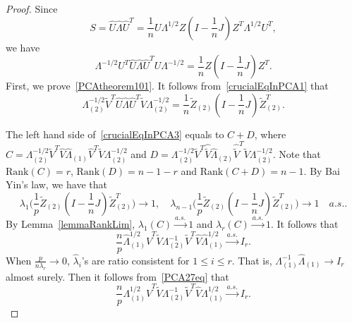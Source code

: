 \begin{proof}

    Since
    \begin{equation*}
        S=\hat{U}\hat{\Lambda}\hat{U}^T=
        \frac{1}{n}U\Lambda^{1/2}Z(I-\frac{1}{n}J)Z^T \Lambda^{1/2} U^T,
    \end{equation*}
    we have
    \begin{equation}\label{crucialEqInPCA1}
        \Lambda^{-1/2}U^T \hat{U}\hat{\Lambda}\hat{U}^T U\Lambda^{-1/2}=
        \frac{1}{n}Z(I-\frac{1}{n}J)Z^T. 
    \end{equation}
    First, we prove~\eqref{PCAtheorem101}.
    It follows from~\eqref{crucialEqInPCA1} that
    \begin{equation}\label{crucialEqInPCA3}
        \Lambda^{-1/2}_{(2)}\tilde{V}^T \hat{U}\hat{\Lambda}\hat{U}^T \tilde{V}\Lambda^{-1/2}_{(2)}=
        \frac{1}{n}\tilde{Z}_{(2)}(I-\frac{1}{n}J)\tilde{Z}_{(2)}^T.
    \end{equation}

    The left hand side of~\eqref{crucialEqInPCA3} equals to $C+D$, where 
    $C= \Lambda^{-1/2}_{(2)}\tilde{V}^T \hat{V}\hat{\Lambda}_{(1)}\hat{V}^T \tilde{V}\Lambda^{-1/2}_{(2)}$ 
    and 
    $D= \Lambda^{-1/2}_{(2)}\tilde{V}^T \hat{\tilde{V}}\hat{\Lambda}_{(2)}\hat{\tilde{V}}^T \tilde{V}\Lambda^{-1/2}_{(2)}$.
    Note that $\mathrm{Rank}(C)=r$, $\mathrm{Rank}(D)=n-1-r$ and $\mathrm{Rank}(C+D)=n-1$. By Bai Yin's law, we have that
    \begin{equation*}
        \lambda_1\big(\frac{1}{p}\tilde{Z}_{(2)}(I-\frac{1}{n}J)\tilde{Z}_{(2)}^T\big)\to 1,\quad
        \lambda_{n-1}\big(\frac{1}{p}\tilde{Z}_{(2)}(I-\frac{1}{n}J)\tilde{Z}_{(2)}^T\big)\to 1\quad  a.s..
    \end{equation*}
    By Lemma~\ref{lemmaRankLim}, $\lambda_{1}(C)\xrightarrow{a.s.}1$ and $\lambda_{r}(C)\xrightarrow{a.s.}1$. It follows that
    \begin{equation}\label{PCA27eq}
        \frac{n}{p}\hat{\Lambda}_{(1)}^{1/2}\hat{V}^T \tilde{V}\Lambda^{-1}_{(2)}\tilde{V}^T \hat{V}\hat{\Lambda}_{(1)}^{1/2}\xrightarrow{a.s.} I_r.
    \end{equation}
    When $\frac{p}{n\lambda_r}\to 0$, $\hat{\lambda}_i$'s are ratio consistent for $1\leq i\leq r$. That is, $\Lambda_{(1)}^{-1}\hat{\Lambda}_{(1)}\to I_r$ almost surely. Then it follows from~\eqref{PCA27eq} that
    \begin{equation}
        \frac{n}{p}\Lambda_{(1)}^{1/2}\hat{V}^T \tilde{V}\Lambda^{-1}_{(2)}\tilde{V}^T \hat{V}\Lambda_{(1)}^{1/2}\xrightarrow{a.s.} I_r.
    \end{equation}


\end{proof}
